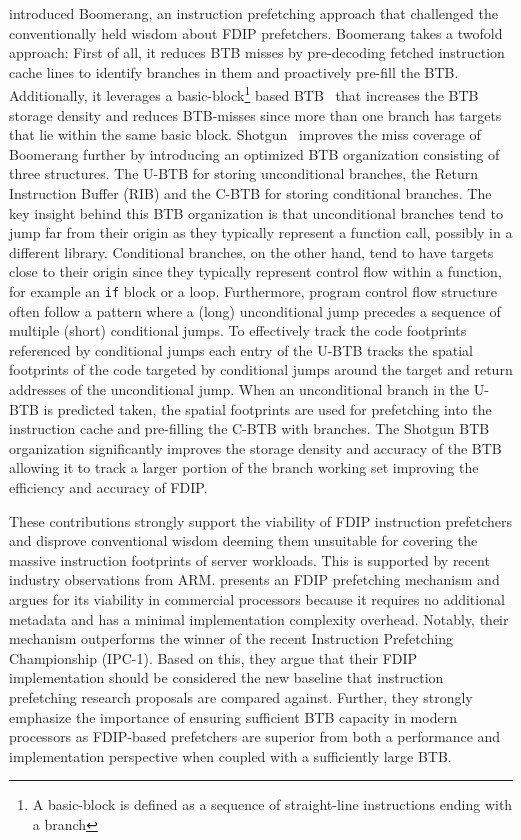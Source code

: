 \documentclass[../main.tex]{subfiles}
\begin{document}
\begin{refsection}
\textcite{kumar17_boomer} introduced Boomerang, an instruction
prefetching approach that challenged the conventionally held wisdom
about FDIP prefetchers. Boomerang takes a twofold approach: First of
all, it reduces BTB misses by pre-decoding fetched instruction cache
lines to identify branches in them and proactively pre-fill the
BTB. Additionally, it leverages a basic-block\footnote{A basic-block
  is defined as a sequence of straight-line instructions ending with a
  branch} based BTB~\cite{yeh92_compr_instr_fetch_mechan_for} that
increases the BTB storage density and reduces BTB-misses since more
than one branch has targets that lie within the same basic
block. Shotgun~\cite{kumar18_blast_throug_front_end_bottl_with_shotg,kumar20_shoot_down_server_front_end_bottl}
improves the miss coverage of Boomerang further by introducing an
optimized BTB organization consisting of three structures. The U-BTB
for storing unconditional branches, the Return Instruction Buffer
(RIB) and the C-BTB for storing conditional branches. The key insight
behind this BTB organization is that unconditional branches tend to
jump far from their origin as they typically represent a function
call, possibly in a different library. Conditional branches, on the
other hand, tend to have targets close to their origin since they
typically represent control flow within a function, for example an
\texttt{if} block or a loop. Furthermore, program control flow
structure often follow a pattern where a (long) unconditional jump
precedes a sequence of multiple (short) conditional jumps. To
effectively track the code footprints referenced by conditional jumps
each entry of the U-BTB tracks the spatial footprints of the code
targeted by conditional jumps around the target and return addresses
of the unconditional jump. When an unconditional branch in the U-BTB
is predicted taken, the spatial footprints are used for prefetching
into the instruction cache and pre-filling the C-BTB with
branches. The Shotgun BTB organization significantly improves the
storage density and accuracy of the BTB allowing it to track a larger
portion of the branch working set improving the efficiency and
accuracy of FDIP.

These contributions strongly support the viability of FDIP instruction
prefetchers and disprove conventional wisdom deeming them unsuitable
for covering the massive instruction footprints of server
workloads. This is supported by recent industry observations from
ARM. \textcite{ishii21_re_fetch_direc_instr_prefet} presents an FDIP
prefetching mechanism and argues for its viability in commercial
processors because it requires no additional metadata and has a
minimal implementation complexity overhead. Notably, their mechanism
outperforms the winner of the recent Instruction Prefetching
Championship (IPC-1). Based on this, they argue that their FDIP
implementation should be considered the new baseline that instruction
prefetching research proposals are compared against. Further, they
strongly emphasize the importance of ensuring sufficient BTB capacity
in modern processors as FDIP-based prefetchers are superior from both
a performance and implementation perspective when coupled with a
sufficiently large BTB.





\end{refsection}
\end{document}
